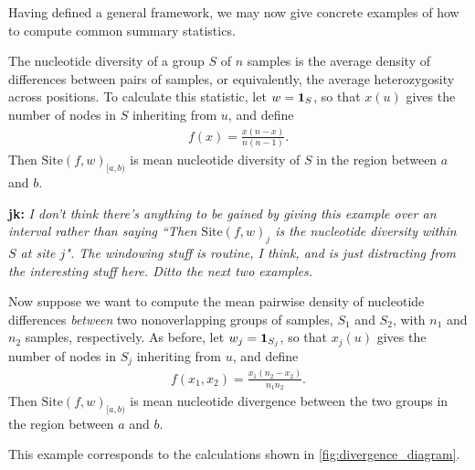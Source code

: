 \documentclass{article}
\newcommand{\site}{\mbox{Site}} %
\newcommand{\iw}{w} %
\newcommand{\nw}{x} %
\newcommand{\jk}[1]{{\color{red}\textbf{jk:} \it #1}}
\begin{document}
Having defined a general framework, we may now give concrete examples
of how to compute common summary statistics.

\begin{example} \label{ex:site_diversity}
    The nucleotide diversity of a group $S$ of $n$ samples
    is the average density of differences between pairs of samples,
    or equivalently, the average heterozygosity across positions.
    To calculate this statistic,
    let $\iw = \bone_S$,
    so that $\nw(u)$ gives the number of nodes in $S$ inheriting from $u$,
    and define
    \begin{align*}
        f(x) = \frac{x (n - x)}{n (n-1)} .
    \end{align*}
    Then $\site(f, \iw)_{[a,b)}$ is mean nucleotide diversity of $S$ in the region between $a$ and $b$.
\end{example}

\jk{I don't think there's anything to be gained by giving this example over
an interval rather than saying ``Then $\site(f, \iw)_{j}$ is the nucleotide
diversity within $S$ at site $j$". The windowing stuff is routine, I think, and is just
distracting from the interesting stuff here. Ditto the next two examples.}

\begin{example} \label{ex:site_divergence}
    Now suppose we want to compute the mean pairwise density of nucleotide differences
    \emph{between} two nonoverlapping groups of samples, $S_1$ and $S_2$,
    with $n_1$ and $n_2$ samples, respectively.
    As before,
    let $\iw_j = \bone_{S_j}$,
    so that $\nw_{j}(u)$ gives the number of nodes in $S_j$ inheriting from $u$,
    and define
    \begin{align*}
        f(x_1, x_2) = \frac{x_1 (n_2 - x_2)}{n_1 n_2} .
    \end{align*}
    Then $\site(f, \iw)_{[a,b)}$ is mean nucleotide divergence between the two groups
    in the region between $a$ and $b$.
\end{example}

This example corresponds to the calculations shown in \autoref{fig:divergence_diagram}.
\end{document}
